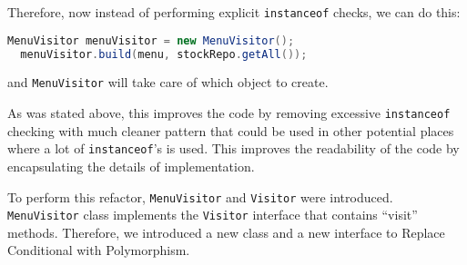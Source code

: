 \documentclass{article}
\newcommand{\code}[1]{\texttt{#1}}
\begin{document}
\noindent Therefore, now instead of performing explicit \code{instanceof} checks, we can do this:

\begin{lstlisting}[language=Java]
  MenuVisitor menuVisitor = new MenuVisitor();
  menuVisitor.build(menu, stockRepo.getAll());
\end{lstlisting}

\noindent and \code{MenuVisitor} will take care of which object to create.

As was stated above, this improves the code by removing excessive \code{instanceof} checking with much cleaner pattern that could be used in other potential places where a lot of \code{instanceof}'s is used. This improves the readability of the code by encapsulating the details of implementation.

To perform this refactor, \code{MenuVisitor} and \code{Visitor} were introduced. \code{MenuVisitor} class implements the \code{Visitor} interface that contains ``visit'' methods. Therefore, we introduced a new class and a new interface to Replace Conditional with Polymorphism.

\end{document}
